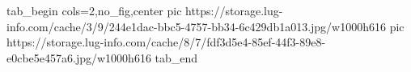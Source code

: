  
 
 
 
 


\ifcmt
  tab_begin cols=2,no_fig,center
     pic https://storage.lug-info.com/cache/3/9/244e1dac-bbc5-4757-bb34-6c429db1a013.jpg/w1000h616%
		 pic https://storage.lug-info.com/cache/8/7/fdf3d5e4-85ef-44f3-89e8-e0cbe5e457a6.jpg/w1000h616%
  tab_end
\fi
